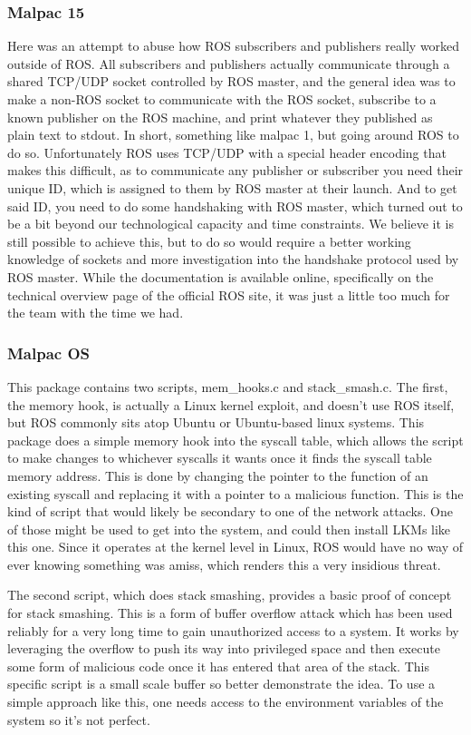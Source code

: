 \documentclass[IEEEtran,letterpaper,10pt,notitlepage,draftclsnofoot,onecolumn]{article}
\begin{document}
\subsubsection{Malpac 15}
Here was an attempt to abuse how ROS subscribers and publishers really worked outside of ROS. 
All subscribers and publishers actually communicate through a shared TCP/UDP socket controlled by ROS master, and the general idea was to make a non-ROS socket to communicate with the ROS socket, subscribe to a known publisher on the ROS machine, and print whatever they published as plain text to stdout. 
In short, something like malpac 1, but going around ROS to do so. Unfortunately ROS uses TCP/UDP with a special header encoding that makes this difficult, as to communicate any publisher or subscriber you need their unique ID, which is assigned to them by ROS master at their launch. 
And to get said ID, you need to do some handshaking with ROS master, which turned out to be a bit beyond our technological capacity and time constraints. 
We believe it is still possible to achieve this, but to do so would require a better working knowledge of sockets and more investigation into the handshake protocol used by ROS master. 
While the documentation is available online, specifically on the technical overview page of the official ROS site\cite{ROS}, it was just a little too much for the team with the time we had.

\subsubsection{Malpac OS}
This package contains two scripts, mem\_hooks.c and stack\_smash.c.
The first, the memory hook, is actually a Linux kernel exploit, and doesn't use ROS itself, but ROS commonly sits atop Ubuntu or Ubuntu-based linux systems. 
This package does a simple memory hook into the syscall table, which allows the script to make changes to whichever syscalls it wants once it finds the syscall table memory address. 
This is done by changing the pointer to the function of an existing syscall and replacing it with a pointer to a malicious function.
This is the kind of script that would likely be secondary to one of the network attacks. One of those might be used to get into the system, and could then install LKMs like this one. Since it operates at the kernel level in Linux, ROS would have no way of ever knowing something was amiss, which renders this a very insidious threat.

The second script, which does stack smashing, provides a basic proof of concept for stack smashing. 
This is a form of buffer overflow attack which has been used reliably for a very long time to gain unauthorized access to a system. 
It works by leveraging the overflow to push its way into privileged space and then execute some form of malicious code once it has entered that area of the stack.
This specific script is a small scale buffer so better demonstrate the idea. 
To use a simple approach like this, one needs access to the environment variables of the system so it's not perfect. 
\end{document}
